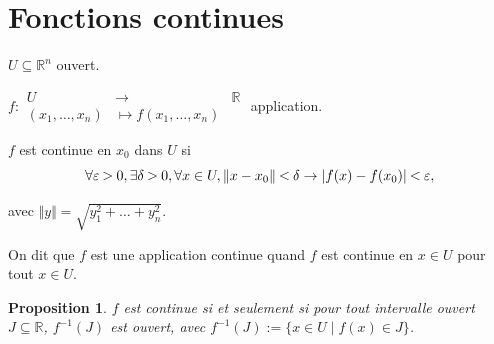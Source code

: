 \documentclass[french]{article}
\title{\bsc{Géométrie différentielle}}
\date{2023-2024}
\newtheorem{prop}{Proposition}[section]
\newcommand{\lesss}{\rotatebox[origin=c]{90}{$\land$}}
\newcommand{\less}{\ \lesss\ }
\newcommand{\biggg}{\rotatebox[origin=c]{90}{$\lor$}}
\newcommand{\bg}{\ \biggg\ }
\begin{document}
\maketitle

\tableofcontents

\section{Fonctions continues}


$U \subseteq \mathbb{R}^n$ ouvert.

$f:
  \begin{array}{lll}
  U & \longrightarrow & \mathbb{R} \\
  (x_1, \dots, x_n) & \longmapsto f(x_1, \dots, x_n)
  \end{array}$ application.

$f$ est continue en $x_0$ dans $U$ si $$\forall \varepsilon \bg 0, \exists \delta  \bg 0, \forall x \in U, \Vert x-x_0 \Vert \less \delta \to \lvert f(x)-f(x_0) \rvert \less \varepsilon,  $$

avec $\Vert y \Vert = \sqrt{ y_1 ^2 + \dots + y_n ^2 }  $.

On dit que $f$ est une application continue quand $f$ est continue en $x \in U$ pour tout $x \in U$.

\begin{prop}
  $f$ est continue si et seulement si pour tout intervalle ouvert $J \subseteq \mathbb{R}$, $f ^{-1} (J)$ est ouvert, avec $f ^{-1} (J) := \{ x \in U \mid f(x) \in J \} $.
\end{prop}
\end{document}
